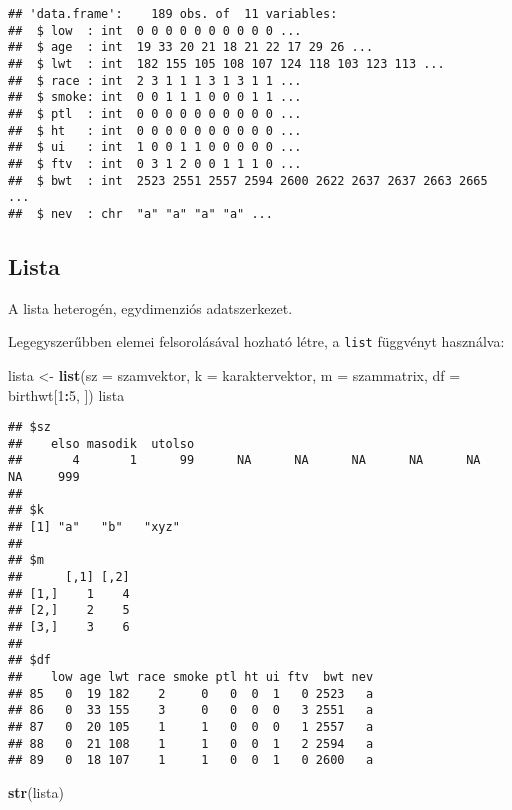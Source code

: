 \documentclass[]{book}
\newenvironment{Shaded}{\begin{snugshade}}{\end{snugshade}}
\newcommand{\DataTypeTok}[1]{\textcolor[rgb]{0.13,0.29,0.53}{#1}}
\newcommand{\DecValTok}[1]{\textcolor[rgb]{0.00,0.00,0.81}{#1}}
\newcommand{\KeywordTok}[1]{\textcolor[rgb]{0.13,0.29,0.53}{\textbf{#1}}}
\newcommand{\NormalTok}[1]{#1}
\newcommand{\OperatorTok}[1]{\textcolor[rgb]{0.81,0.36,0.00}{\textbf{#1}}}
\newcommand{\StringTok}[1]{\textcolor[rgb]{0.31,0.60,0.02}{#1}}
\begin{document}
\begin{verbatim}
## 'data.frame':    189 obs. of  11 variables:
##  $ low  : int  0 0 0 0 0 0 0 0 0 0 ...
##  $ age  : int  19 33 20 21 18 21 22 17 29 26 ...
##  $ lwt  : int  182 155 105 108 107 124 118 103 123 113 ...
##  $ race : int  2 3 1 1 1 3 1 3 1 1 ...
##  $ smoke: int  0 0 1 1 1 0 0 0 1 1 ...
##  $ ptl  : int  0 0 0 0 0 0 0 0 0 0 ...
##  $ ht   : int  0 0 0 0 0 0 0 0 0 0 ...
##  $ ui   : int  1 0 0 1 1 0 0 0 0 0 ...
##  $ ftv  : int  0 3 1 2 0 0 1 1 1 0 ...
##  $ bwt  : int  2523 2551 2557 2594 2600 2622 2637 2637 2663 2665 ...
##  $ nev  : chr  "a" "a" "a" "a" ...
\end{verbatim}

\hypertarget{lista}{%
\subsection{Lista}\label{lista}}

A lista heterogén, egydimenziós adatszerkezet.

Legegyszerűbben elemei felsorolásával hozható létre, a \texttt{list} függvényt használva:

\begin{Shaded}
\begin{Highlighting}[]
\NormalTok{lista <-}\StringTok{ }\KeywordTok{list}\NormalTok{(}\DataTypeTok{sz =}\NormalTok{ szamvektor, }\DataTypeTok{k =}\NormalTok{ karaktervektor, }\DataTypeTok{m =}\NormalTok{ szammatrix, }\DataTypeTok{df =}\NormalTok{ birthwt[}\DecValTok{1}\OperatorTok{:}\DecValTok{5}\NormalTok{, }
\NormalTok{    ])}
\NormalTok{lista}
\end{Highlighting}
\end{Shaded}

\begin{verbatim}
## $sz
##    elso masodik  utolso                                                         
##       4       1      99      NA      NA      NA      NA      NA      NA     999 
## 
## $k
## [1] "a"   "b"   "xyz"
## 
## $m
##      [,1] [,2]
## [1,]    1    4
## [2,]    2    5
## [3,]    3    6
## 
## $df
##    low age lwt race smoke ptl ht ui ftv  bwt nev
## 85   0  19 182    2     0   0  0  1   0 2523   a
## 86   0  33 155    3     0   0  0  0   3 2551   a
## 87   0  20 105    1     1   0  0  0   1 2557   a
## 88   0  21 108    1     1   0  0  1   2 2594   a
## 89   0  18 107    1     1   0  0  1   0 2600   a
\end{verbatim}

\begin{Shaded}
\begin{Highlighting}[]
\KeywordTok{str}\NormalTok{(lista)}
\end{Highlighting}
\end{Shaded}
\end{document}
